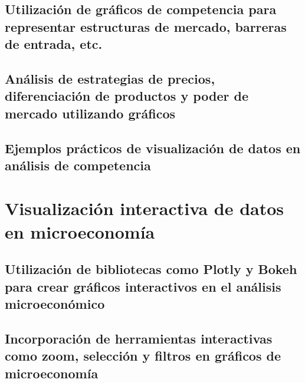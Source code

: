 \documentclass[
  a4paper,
]{article}
\begin{document}
\hypertarget{utilizaciuxf3n-de-gruxe1ficos-de-competencia-para-representar-estructuras-de-mercado-barreras-de-entrada-etc.}{%
\subsection{Utilización de gráficos de competencia para representar
estructuras de mercado, barreras de entrada,
etc.}\label{utilizaciuxf3n-de-gruxe1ficos-de-competencia-para-representar-estructuras-de-mercado-barreras-de-entrada-etc.}}

\hypertarget{anuxe1lisis-de-estrategias-de-precios-diferenciaciuxf3n-de-productos-y-poder-de-mercado-utilizando-gruxe1ficos}{%
\subsection{Análisis de estrategias de precios, diferenciación de
productos y poder de mercado utilizando
gráficos}\label{anuxe1lisis-de-estrategias-de-precios-diferenciaciuxf3n-de-productos-y-poder-de-mercado-utilizando-gruxe1ficos}}

\hypertarget{ejemplos-pruxe1cticos-de-visualizaciuxf3n-de-datos-en-anuxe1lisis-de-competencia}{%
\subsection{Ejemplos prácticos de visualización de datos en análisis de
competencia}\label{ejemplos-pruxe1cticos-de-visualizaciuxf3n-de-datos-en-anuxe1lisis-de-competencia}}

\hypertarget{visualizaciuxf3n-interactiva-de-datos-en-microeconomuxeda}{%
\section{Visualización interactiva de datos en
microeconomía}\label{visualizaciuxf3n-interactiva-de-datos-en-microeconomuxeda}}

\hypertarget{utilizaciuxf3n-de-bibliotecas-como-plotly-y-bokeh-para-crear-gruxe1ficos-interactivos-en-el-anuxe1lisis-microeconuxf3mico}{%
\subsection{Utilización de bibliotecas como Plotly y Bokeh para crear
gráficos interactivos en el análisis
microeconómico}\label{utilizaciuxf3n-de-bibliotecas-como-plotly-y-bokeh-para-crear-gruxe1ficos-interactivos-en-el-anuxe1lisis-microeconuxf3mico}}

\hypertarget{incorporaciuxf3n-de-herramientas-interactivas-como-zoom-selecciuxf3n-y-filtros-en-gruxe1ficos-de-microeconomuxeda}{%
\subsection{Incorporación de herramientas interactivas como zoom,
selección y filtros en gráficos de
microeconomía}\label{incorporaciuxf3n-de-herramientas-interactivas-como-zoom-selecciuxf3n-y-filtros-en-gruxe1ficos-de-microeconomuxeda}}
\end{document}
